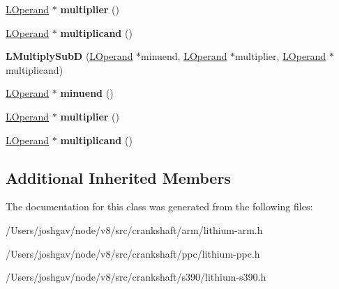\begin{DoxyCompactItemize}
\item 
\hyperlink{classv8_1_1internal_1_1_l_operand}{L\+Operand} $\ast$ {\bfseries multiplier} ()\hypertarget{classv8_1_1internal_1_1_l_multiply_sub_d_a219c72ff0d421c44a18ee889f22ec219}{}\label{classv8_1_1internal_1_1_l_multiply_sub_d_a219c72ff0d421c44a18ee889f22ec219}

\item 
\hyperlink{classv8_1_1internal_1_1_l_operand}{L\+Operand} $\ast$ {\bfseries multiplicand} ()\hypertarget{classv8_1_1internal_1_1_l_multiply_sub_d_a8bf065db7745a2a47be05c7a17082272}{}\label{classv8_1_1internal_1_1_l_multiply_sub_d_a8bf065db7745a2a47be05c7a17082272}

\item 
{\bfseries L\+Multiply\+SubD} (\hyperlink{classv8_1_1internal_1_1_l_operand}{L\+Operand} $\ast$minuend, \hyperlink{classv8_1_1internal_1_1_l_operand}{L\+Operand} $\ast$multiplier, \hyperlink{classv8_1_1internal_1_1_l_operand}{L\+Operand} $\ast$multiplicand)\hypertarget{classv8_1_1internal_1_1_l_multiply_sub_d_a66414bb6cbf154e8fece734e80bb8417}{}\label{classv8_1_1internal_1_1_l_multiply_sub_d_a66414bb6cbf154e8fece734e80bb8417}

\item 
\hyperlink{classv8_1_1internal_1_1_l_operand}{L\+Operand} $\ast$ {\bfseries minuend} ()\hypertarget{classv8_1_1internal_1_1_l_multiply_sub_d_adf13d3353a2816162ee757c048c97198}{}\label{classv8_1_1internal_1_1_l_multiply_sub_d_adf13d3353a2816162ee757c048c97198}

\item 
\hyperlink{classv8_1_1internal_1_1_l_operand}{L\+Operand} $\ast$ {\bfseries multiplier} ()\hypertarget{classv8_1_1internal_1_1_l_multiply_sub_d_a219c72ff0d421c44a18ee889f22ec219}{}\label{classv8_1_1internal_1_1_l_multiply_sub_d_a219c72ff0d421c44a18ee889f22ec219}

\item 
\hyperlink{classv8_1_1internal_1_1_l_operand}{L\+Operand} $\ast$ {\bfseries multiplicand} ()\hypertarget{classv8_1_1internal_1_1_l_multiply_sub_d_a8bf065db7745a2a47be05c7a17082272}{}\label{classv8_1_1internal_1_1_l_multiply_sub_d_a8bf065db7745a2a47be05c7a17082272}

\end{DoxyCompactItemize}
\subsection*{Additional Inherited Members}


The documentation for this class was generated from the following files\+:\begin{DoxyCompactItemize}
\item 
/\+Users/joshgav/node/v8/src/crankshaft/arm/lithium-\/arm.\+h\item 
/\+Users/joshgav/node/v8/src/crankshaft/ppc/lithium-\/ppc.\+h\item 
/\+Users/joshgav/node/v8/src/crankshaft/s390/lithium-\/s390.\+h\end{DoxyCompactItemize}
